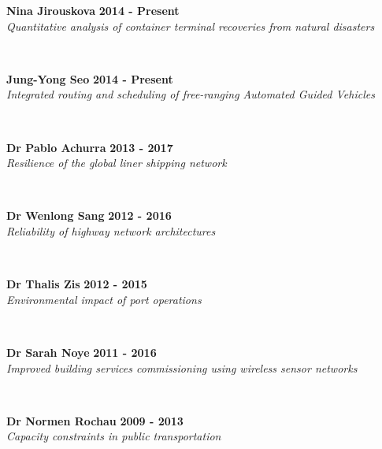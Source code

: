 \documentclass[margin]{res}
\newcommand\tab[1][1cm]{\hspace*{#1}}
\begin{document}
\begin{resume}
	\begin{minipage}{\textwidth}
	{\bf Nina Jirouskova} \hfill {\bf 2014 - Present} \\
	\tab[0.2in] \textit{Quantitative analysis of container terminal recoveries from natural disasters}
	\end{minipage}
	\\
	\vspace{0.03in}
	\begin{minipage}{\textwidth}
	{\bf Jung-Yong Seo} \hfill {\bf 2014 - Present} \\
	\tab[0.2in] \textit{Integrated routing and scheduling of free-ranging Automated Guided Vehicles}
	\end{minipage}
	\\
	\vspace{0.03in}
	\begin{minipage}{\textwidth}
	{\bf Dr Pablo Achurra} \hfill {\bf 2013 - 2017} \\
	\tab[0.2in] \textit{Resilience of the global liner shipping network}
	\end{minipage}
	\\
	\vspace{0.03in}
	\begin{minipage}{\textwidth}
	{\bf Dr Wenlong Sang} \hfill {\bf 2012 - 2016} \\
	\tab[0.2in] \textit{Reliability of highway network architectures}
	\end{minipage}
	\\
	\vspace{0.03in}
	\begin{minipage}{\textwidth}
	{\bf Dr Thalis Zis} \hfill {\bf 2012 - 2015} \\
	\tab[0.2in] \textit{Environmental impact of port operations}
	\end{minipage}
	\\
	\vspace{0.03in}
	\begin{minipage}{\textwidth}
	{\bf Dr Sarah Noye} \hfill {\bf 2011 - 2016} \\
	\tab[0.2in] \textit{Improved building services commissioning using wireless sensor networks}
	\end{minipage}
	\\
	\vspace{0.03in}
	\begin{minipage}{\textwidth}
	{\bf Dr Normen Rochau} \hfill {\bf 2009 - 2013} \\
	\tab[0.2in] \textit{Capacity constraints in public transportation}

\end{minipage}
\end{resume}
\end{document}
